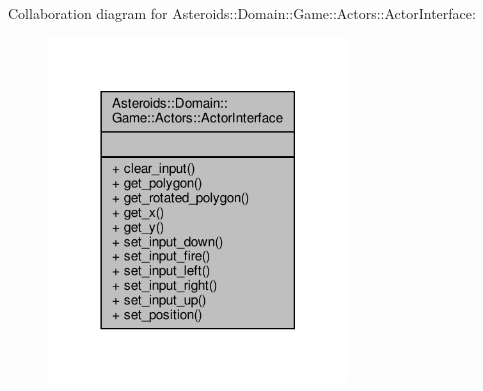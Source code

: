 Collaboration diagram for Asteroids\+:\+:Domain\+:\+:Game\+:\+:Actors\+:\+:Actor\+Interface\+:\nopagebreak
\begin{figure}[H]
\begin{center}
\leavevmode
\includegraphics[width=225pt]{classAsteroids_1_1Domain_1_1Game_1_1Actors_1_1ActorInterface__coll__graph}
\end{center}
\end{figure}
